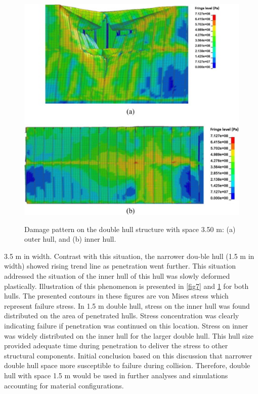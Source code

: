 \documentclass[../Final.tex]{subfiles}
\begin{document}
\begin{figure}[ht]
    \centering
    \includegraphics[width=\columnwidth]{fig8.jpg}
    \label{fig8}
    \caption{Damage pattern on the double hull structure with space 3.50 m: (a) outer hull, and (b) inner hull.}
\end{figure}

3.5 m in width. Contrast with this situation, the narrower dou-ble hull (1.5 m in width) showed rising trend line as penetration went further. 
This situation addressed the situation of the inner hull of this hull was slowly deformed plastically. Illustration of this phenomenon is presented in \ref{fig7} and \ref{fig8} for both hulls. 
The presented contours in these figures are von Mises stress which represent failure stress. In 1.5 m double hull, stress on the inner hull was found distributed on the area of penetrated hulls. 
Stress concentration was clearly indicating failure if pen­etration was continued on this location. 
Stress on inner was widely distributed on the inner hull for the larger double hull. This hull size provided adequate time during penetration to deliver the stress to other structural components. 
Initial conclusion based on this discussion that narrower double hull space more susceptible to failure during collision. 
Therefore, double hull with space 1.5 m would be used in further analyses and simulations accounting for material configurations. 
\end{document}
